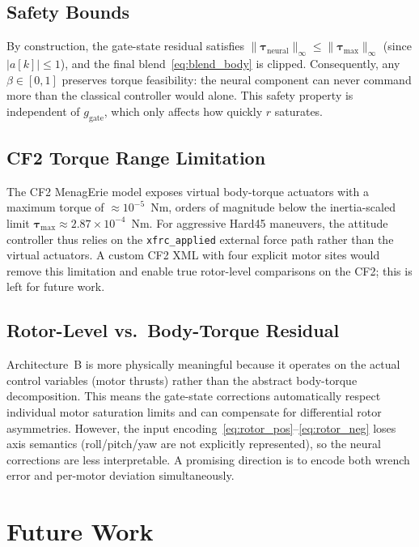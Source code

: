\documentclass[conference]{IEEEtran}
\begin{document}
\subsection{Safety Bounds}

By construction, the gate-state residual satisfies
$\|\boldsymbol{\tau}_{\mathrm{neural}}\|_\infty \le \|\boldsymbol{\tau}_{\max}\|_\infty$
(since $|a[k]| \le 1$), and the final blend~\eqref{eq:blend_body} is clipped.
Consequently, any $\beta \in [0,1]$ preserves torque feasibility: the neural
component can never command more than the classical controller would alone.
This safety property is independent of $g_{\mathrm{gate}}$, which only affects
how quickly $r$ saturates.

\subsection{CF2 Torque Range Limitation}

The CF2 MenagErie model exposes virtual body-torque actuators with a maximum
torque of $\approx 10^{-5}$~Nm, orders of magnitude below the
inertia-scaled limit $\boldsymbol{\tau}_{\max} \approx 2.87 \times 10^{-4}$~Nm.
For aggressive Hard45 maneuvers, the attitude controller thus relies on the
\texttt{xfrc\_applied} external force path rather than the virtual actuators.
A custom CF2 XML with four explicit motor sites would remove this limitation
and enable true rotor-level comparisons on the CF2; this is left for future
work.

\subsection{Rotor-Level vs.\ Body-Torque Residual}

Architecture~B is more physically meaningful because it operates on the
actual control variables (motor thrusts) rather than the abstract body-torque
decomposition.
This means the gate-state corrections automatically respect individual motor
saturation limits and can compensate for differential rotor asymmetries.
However, the input encoding~\eqref{eq:rotor_pos}--\eqref{eq:rotor_neg}
loses axis semantics (roll/pitch/yaw are not explicitly represented), so the
neural corrections are less interpretable.
A promising direction is to encode both wrench error and per-motor deviation
simultaneously.

\section{Future Work}
\label{sec:future}
\end{document}
